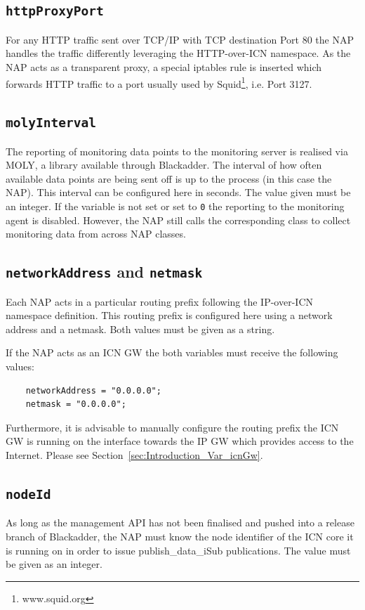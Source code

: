 \documentclass[a4paper,11pt,titlepage]{report}
\begin{document}
\subsection{\texttt{httpProxyPort}}\label{sec:Introduction_Var_httpProxyPort}
For any HTTP traffic sent over TCP/IP with TCP destination Port 80 the NAP handles the traffic differently leveraging the HTTP-over-ICN namespace. As the NAP acts as a transparent proxy, a special iptables rule is inserted which forwards HTTP traffic to a port usually used by Squid\footnote{www.squid.org}, i.e. Port 3127.

\subsection{\texttt{molyInterval}}\label{sec:Introduction_Var_molyInterval}
The reporting of monitoring data points to the monitoring server is realised via \ac{MOLY}, a library available through Blackadder. The interval of how often available data points are being sent off is up to the process (in this case the \ac{NAP}). This interval can be configured here in seconds. The value given must be an integer. If the variable is not set or set to \texttt{0} the reporting to the monitoring agent is disabled. However, the \ac{NAP} still calls the corresponding class to collect monitoring data from across \ac{NAP} classes.

\subsection{\texttt{networkAddress} and \texttt{netmask}}\label{sec:Introduction_Var_networkAddressNetmask}
Each \ac{NAP} acts in a particular routing prefix following the IP-over-ICN namespace definition. This routing prefix is configured here using a network address and a netmask. Both values must be given as a string. 

If the \ac{NAP} acts as an ICN \ac{GW} the both variables must receive the following values:

\begin{lstlisting}
	networkAddress = "0.0.0.0";
	netmask = "0.0.0.0";
\end{lstlisting}

Furthermore, it is advisable to manually configure the routing prefix the ICN GW is running on the interface towards the IP \ac{GW} which provides access to the Internet. Please see Section~\ref{sec:Introduction_Var_icnGw}.

\subsection{\texttt{nodeId}}
As long as the management API has not been finalised and pushed into a release branch of Blackadder, the \ac{NAP} must know the node identifier of the ICN core it is running on in order to issue publish\_data\_iSub publications. The value must be given as an integer.
\end{document}
